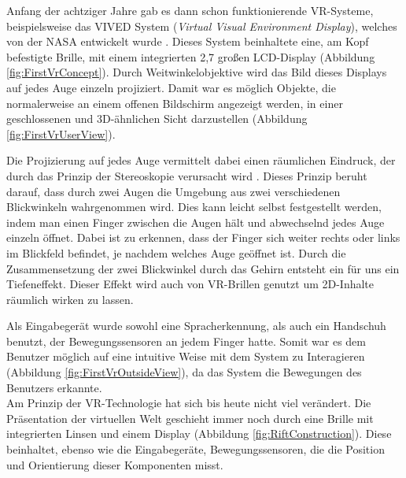 Anfang der achtziger Jahre gab es dann schon funktionierende VR-Systeme, beispielsweise das VIVED System (\textit{Virtual Visual Environment Display}), welches von der NASA entwickelt wurde \cite{bib:NasaVr}. Dieses System beinhaltete eine, am Kopf befestigte Brille, mit einem integrierten 2,7\dq{} großen LCD-Display (Abbildung \ref{fig:FirstVrConcept}). Durch Weitwinkelobjektive wird das Bild dieses Displays auf jedes Auge einzeln projiziert. Damit war es möglich Objekte, die normalerweise an einem offenen Bildschirm angezeigt werden, in einer geschlossenen und 3D-ähnlichen Sicht darzustellen (Abbildung \ref{fig:FirstVrUserView}). 

Die Projizierung auf jedes Auge vermittelt dabei einen räumlichen Eindruck, der durch das Prinzip der Stereoskopie verursacht wird \cite{bib:Stereoscopy}. Dieses Prinzip beruht darauf, dass durch zwei Augen die Umgebung aus zwei verschiedenen Blickwinkeln wahrgenommen wird. Dies kann leicht selbst festgestellt werden, indem man einen Finger zwischen die Augen hält und abwechselnd jedes Auge einzeln öffnet. Dabei ist zu erkennen, dass der Finger sich weiter rechts oder links im Blickfeld befindet, je nachdem welches Auge geöffnet ist. Durch die Zusammensetzung der zwei Blickwinkel durch das Gehirn entsteht ein für uns ein Tiefeneffekt. Dieser Effekt wird auch von VR-Brillen genutzt um 2D-Inhalte räumlich wirken zu lassen.

Als Eingabegerät wurde sowohl eine Spracherkennung, als auch ein Handschuh benutzt, der Bewegungssensoren an jedem Finger hatte. Somit war es dem Benutzer möglich auf eine intuitive Weise mit dem System zu Interagieren (Abbildung \ref{fig:FirstVrOutsideView}), da das System die Bewegungen des Benutzers erkannte.\\

Am Prinzip der VR-Technologie hat sich bis heute nicht viel verändert. Die Präsentation der virtuellen Welt geschieht immer noch durch eine Brille mit integrierten Linsen und einem Display (Abbildung \ref{fig:RiftConstruction}). Diese beinhaltet, ebenso wie die Eingabegeräte, Bewegungssensoren, die die Position und Orientierung dieser Komponenten misst.\\ 

